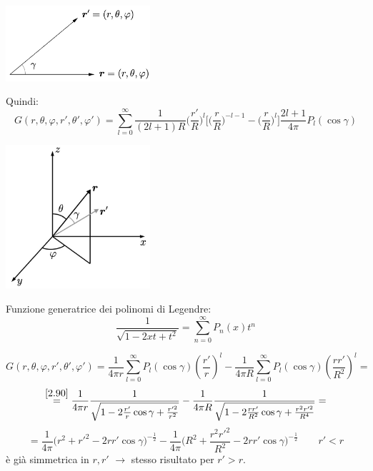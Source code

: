 \documentclass[a4paper,11pt]{report}
\begin{document}
\begin{center}
\includegraphics[width=0.4\textwidth]{immagini/vettori}
\end{center}

Quindi:
\[
G(r,\theta,\varphi,r',\theta',\varphi')=\sum_{l=0}^{\infty}\frac{1}{(2l+1)R} \Big(\frac{r'}{R}\Big)^l \Big[ \Big(\frac{r}{R}\Big)^{-l-1} - \Big(\frac{r}{R}\Big)^l\Big]\frac{2l+1}{4\pi}P_l(\cos\gamma)
\]

\begin{center}
\includegraphics[width=0.4\textwidth]{immagini/vettori2}
\end{center}

Funzione generatrice dei polinomi di Legendre:
\begin{equation}
\frac{1}{\sqrt{1-2xt + t^2}} = \sum_{n=0}^{\infty} P_n(x)t^n
\label{2.90}
\end{equation}

\[
G(r,\theta,\varphi,r',\theta',\varphi')=\frac{1}{4\pi r} \sum_{l=0}^\infty P_l(\cos \gamma)\left(\frac{r'}{r}\right)^l - \frac{1}{4\pi R}\sum_{l=0}^\infty P_l(\cos\gamma)\left(\frac{rr'}{R^2}\right)^l=
\]
\[
\overset{\eqref{2.90}}{=}\frac{1}{4\pi r}\frac{1}{\sqrt{1-2\frac{r'}{r}\cos\gamma + \frac{r'^2}{r^2}}} - \frac{1}{4\pi R}\frac{1}{\sqrt{1-2\frac{rr'}{R^2}\cos\gamma + \frac{r^2r'^2}{R^4}}}=
\]
\begin{equation}
=\frac{1}{4\pi} \Big(r^2 + r'^2 - 2rr'\cos\gamma\Big)^{-\frac{1}{2}} - \frac{1}{4\pi}\Big(R^2 + \frac{r^2r'^2}{R^2} - 2rr'\cos\gamma\Big)^{-\frac{1}{2}} \qquad r'<r
\label{2.91}
\end{equation}
\`e gi\`a simmetrica in $r,r'$ $\rightarrow$ stesso risultato per $r' >r$.
\end{document}
